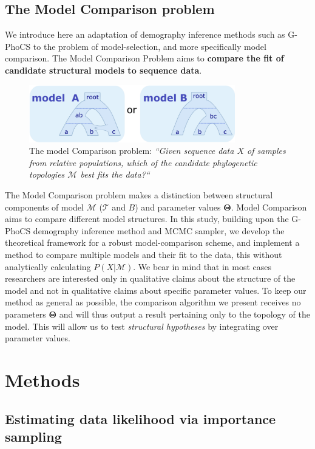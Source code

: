 \documentclass[11pt]{article}
\newcommand{\vect}[1]{\boldsymbol{\mathbf{#1}}}
\newcommand{\M}{\mathcal{M}}
\newcommand{\Tr}{\mathcal{T}}
\newcommand{\T}{\vect{\Theta}}
\newcommand{\1}{\mathbbm{1}}
\newcommand{\gp}{G-PhoCS }
\begin{document}
\subsection{The Model Comparison problem}
We introduce here an adaptation of demography inference methods such as \gp to the problem of model-selection, and more specifically model comparison. The Model Comparison Problem aims to \textbf{compare the fit of candidate structural models to sequence data}.
\begin{figure}[h]
\centering
\includegraphics[width=0.8\textwidth]
{model_A__OR__model_b}
\captionsetup{width=.8\textwidth}
\caption{The model Comparison problem: \textit{“Given sequence data $X$ of samples from
relative populations, which of the candidate phylogenetic topologies $\M$ best fits the data?“}}
\label{fig:model_A__OR__model_b}
\end{figure}


The Model Comparison problem makes a distinction between structural components of model $\M$ ($\Tr$ and $B$) and parameter values $\T$. Model Comparison aims to compare different model structures.
%
In this study, building upon the \gp demography inference method and MCMC sampler, we develop the theoretical framework for a robust model-comparison scheme, and implement a method to compare multiple models and their fit to the data, this without analytically calculating $P(X|\M)$.
%
We bear in mind that in most cases researchers are interested only in qualitative claims about the structure
of the model and not in qualitative claims about specific parameter values. To keep our method as
general as possible, the comparison algorithm we present receives no parameters $\T$ and will thus
output a result pertaining only to the topology of the model. This will allow us to test \textit{structural
hypotheses} by integrating over parameter values.


\section{Methods}


\subsection{Estimating data likelihood via importance sampling}
\end{document}
